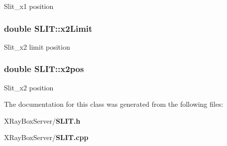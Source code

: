 Slit\_\-x1 position 
\subsubsection{\setlength{\rightskip}{0pt plus 5cm}double \bf{SLIT::x2Limit}\hspace{0.3cm}{\tt  [private]}}\label{classSLIT_69099775d9c8a802a84bd0d0a0fca1fa}


Slit\_\-x2 limit position 
\subsubsection{\setlength{\rightskip}{0pt plus 5cm}double \bf{SLIT::x2pos}\hspace{0.3cm}{\tt  [private]}}\label{classSLIT_8fd69fb384309c14071f088586c902b1}


Slit\_\-x2 position 

The documentation for this class was generated from the following files:\begin{CompactItemize}
\item 
XRay\-Box\-Server/\bf{SLIT.h}\item 
XRay\-Box\-Server/\bf{SLIT.cpp}\end{CompactItemize}
